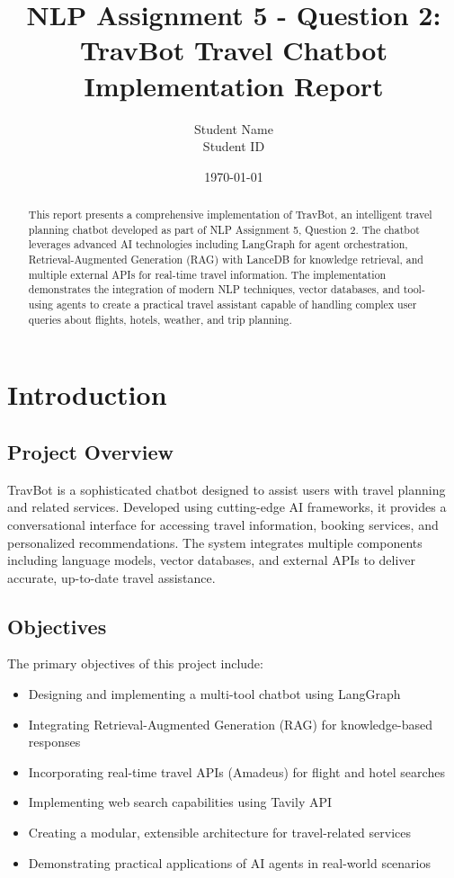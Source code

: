 \documentclass[12pt,a4paper]{article}
\title{NLP Assignment 5 - Question 2: TravBot Travel Chatbot Implementation Report}
\author{Student Name \\ Student ID}
\date{\today}
\begin{document}
\maketitle

\begin{abstract}
This report presents a comprehensive implementation of TravBot, an intelligent travel planning chatbot developed as part of NLP Assignment 5, Question 2. The chatbot leverages advanced AI technologies including LangGraph for agent orchestration, Retrieval-Augmented Generation (RAG) with LanceDB for knowledge retrieval, and multiple external APIs for real-time travel information. The implementation demonstrates the integration of modern NLP techniques, vector databases, and tool-using agents to create a practical travel assistant capable of handling complex user queries about flights, hotels, weather, and trip planning.
\end{abstract}

\tableofcontents
\newpage

\section{Introduction}

\subsection{Project Overview}
TravBot is a sophisticated chatbot designed to assist users with travel planning and related services. Developed using cutting-edge AI frameworks, it provides a conversational interface for accessing travel information, booking services, and personalized recommendations. The system integrates multiple components including language models, vector databases, and external APIs to deliver accurate, up-to-date travel assistance.

\subsection{Objectives}
The primary objectives of this project include:
\begin{itemize}
\item Designing and implementing a multi-tool chatbot using LangGraph
\item Integrating Retrieval-Augmented Generation (RAG) for knowledge-based responses
\item Incorporating real-time travel APIs (Amadeus) for flight and hotel searches
\item Implementing web search capabilities using Tavily API
\item Creating a modular, extensible architecture for travel-related services
\item Demonstrating practical applications of AI agents in real-world scenarios
\end{itemize}
\end{document}
